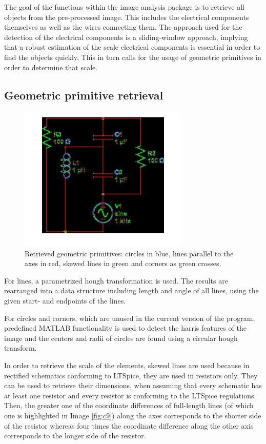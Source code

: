 \documentclass[10pt,twocolumn,letterpaper]{article}
\begin{document}
The goal of the functions within the image analysis package is to retrieve all objects from the pre-processed image. This includes the electrical components themselves as well as the wires connecting them. The approach used for the detection of the electrical components is a sliding-window approach, implying that a robust estimation of the scale electrical components is essential in order to find the objects quickly. This in turn calls for the usage of geometric primitives in order to determine that scale.

\subsection{Geometric primitive retrieval}
\label{subsec:geom}

\begin{figure}[!ht]
\includegraphics[width = 3.2in]{img/geomprim.jpg}
\caption{Retrieved geometric primitives: circles in blue, lines parallel to the axes in red, skewed lines in green and corners as green crosses.}
\label{fig:c8}
\end{figure}
\par

For lines, a parametrized hough transformation is used. The results are rearranged into a data structure including length and angle of all lines, using the given start- and endpoints of the lines.
\par
For circles and corners, which are unused in the current version of the program, predefined MATLAB functionality is used to detect the harris features of the image and the centers and radii of circles are found using a circular hough transform.
\par
In order to retrieve the scale of the elements, skewed lines are used because in rectified schematics conforming to LTSpice, they are used in resistors only. They can be used to retrieve their dimensions, when assuming that every schematic has at least one resistor and every resistor is conforming to the LTSpice regulations. Then, the greater one of the coordinate differences of full-length lines (of which one is highlighted in Image \ref{fig:c9}) along the axes corresponds to the shorter side of the resistor whereas four times the coordinate difference along the other axis corresponds to the longer side of the resistor.
\par
\end{document}

